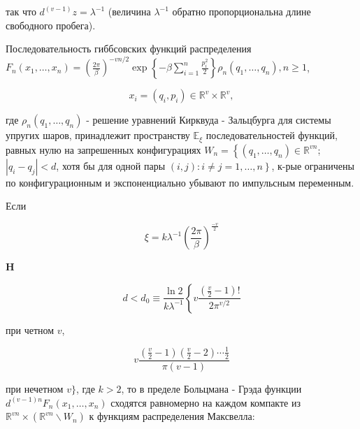\documentclass[10pt]{article}
\begin{document}
так что $d^{(v-1)} z=\lambda^{-1}$ (величина $\lambda^{-1}$ обратно пропорциональна длине свободного пробега).



Последовательность гиббсовских функций распределения $F_{n}\left(x_{1}, \ldots, x_{n}\right)=\left(\frac{2 \pi}{\beta}\right)^{-v n / 2} \exp \left\{-\beta \sum_{i=1}^{n} \frac{p_{i}^{2}}{2}\right\} \rho_{n}\left(q_{1}, \ldots, q_{n}\right), n \geqslant 1$,



\[

x_{i}=\left(q_{i}, p_{i}\right) \in \mathbb{R}^{v} \times \mathbb{R}^{v},

\]



где $\rho_{n}\left(q_{1}, \ldots, q_{n}\right)$ - решение уравнений Кирквуда - Зальцбурга для системы упругих шаров, принадлежит пространству $\mathbb{E}_{\xi}$ последовательностей функций, равных нулю на запрешенных конфигурациях $W_{n}=\left\{\left(q_{1}, \ldots, q_{n}\right) \in \mathbb{R}^{v n}\right.$; $\left|q_{i}-q_{j}\right|<d$, хотя бы для одной пары $\left.(i, j): i \neq j=1, \ldots, n\right\}$, к-рые ограничены по конфигурационным и экспоненциально убывают по импульсным переменным.



Если



\[

\xi=k \lambda^{-1}\left(\frac{2 \pi}{\beta}\right)^{\frac{-v}{2}}

\]



$\mathbf{H}$



\[

d<d_{0} \equiv \frac{\ln 2}{k \lambda^{-1}}\left\{v \frac{\left(\frac{v}{2}-1\right) !}{2 \pi^{v / 2}}\right.

\]



при четном $v$,



\[

v \frac{\left(\frac{v}{2}-1\right)\left(\frac{v}{2}-2\right) \cdots \frac{1}{2}}{\pi(v-1)}

\]



при нечетном $v\}$, где $k>2$, то в пределе Больцмана - Грэда функции $d^{(v-1) n} F_{n}\left(x_{1}, \ldots, x_{n}\right)$ сходятся равномерно на каждом компакте из $\mathbb{R}^{v n} \times\left(\mathbb{R}^{v n} \backslash W_{n}\right)$ к функциям распределения Максвелла:
\end{document}

